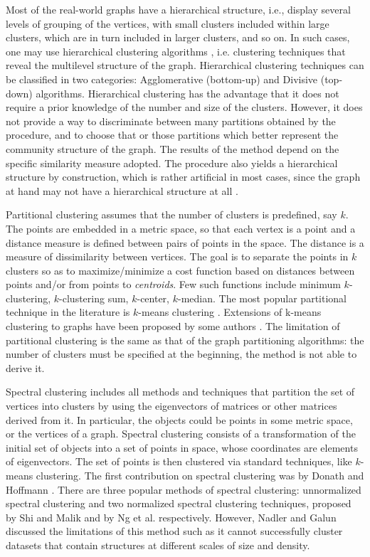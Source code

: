  Most of the real-world graphs have a hierarchical structure, i.e., display several
levels of grouping of the vertices, with small clusters included within large clusters, which are in turn included in larger clusters, and
so on. In such cases, one may use hierarchical clustering algorithms \cite{hastie01}, i.e. clustering techniques that reveal the
multilevel structure of the graph. Hierarchical clustering techniques can
be classified in two categories: Agglomerative (bottom-up) and Divisive (top-down) algorithms. Hierarchical clustering has the advantage
that it does not require a prior knowledge of the number and size of the clusters. However, it does not provide a way to discriminate
between many partitions obtained by the procedure, and to choose that or those partitions which better represent the community structure of
the
graph. The results of the method depend on the specific similarity measure adopted. The procedure also yields a hierarchical structure by
construction, which is rather artificial in most cases, since the graph at hand may not have a hierarchical structure at all
\cite{citeulike:646478}. 

 Partitional clustering assumes that the number of clusters is predefined, say $k$. The points 
are embedded in a metric space, so that each vertex is a point and a distance measure is defined between pairs of points in the space. The
distance is a measure of dissimilarity between vertices. The goal is to separate the points in $k$ clusters so as to maximize/minimize a
cost
function based on distances between points and/or from points to {\em centroids}. Few such functions include minimum $k$-clustering,
$k$-clustering sum, $k$-center, $k$-median. The most popular partitional technique in the literature is $k$-means clustering \cite{kmeans}.
Extensions of k-means clustering to graphs have been proposed by some authors \cite{HlaouiW06,Bezdek:1981}. The limitation of partitional
clustering is
the same as that of the graph partitioning algorithms: the number of clusters must be specified at the beginning, the method is not able to
derive it. 

 Spectral clustering includes all methods and techniques that partition the set of vertices into
clusters by using the eigenvectors of matrices or other matrices derived from it. In particular, the objects could be points in some metric
space, or the vertices of a graph. Spectral clustering consists of a transformation of the initial set of objects into a set of points in
space, whose coordinates are elements of eigenvectors. The set of points is then clustered via standard techniques, like $k$-means
clustering. The first contribution on spectral clustering was by Donath and Hoffmann \cite{Donath:1973}.  There are three
popular methods of
spectral clustering: unnormalized spectral clustering and two normalized spectral clustering techniques, proposed by Shi and Malik
\cite{Shi:2000} and by Ng et al. \cite{Ng01on} respectively. However, Nadler and Galun \cite{nadler} discussed the limitations of this
method such as it
cannot successfully cluster datasets that contain structures at different scales of size and density. 
 
